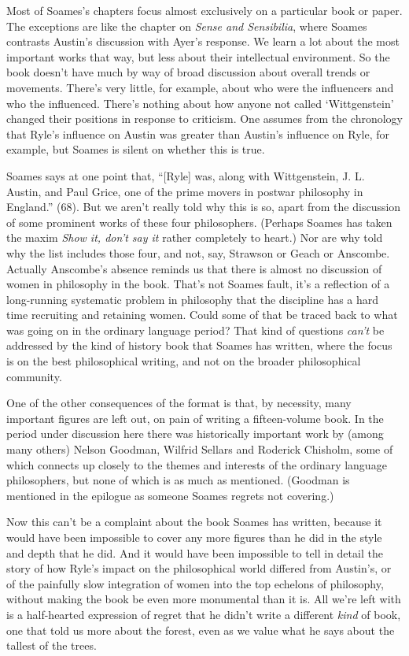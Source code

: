 Most of Soames's chapters focus almost exclusively on a particular book or paper. The exceptions are like the chapter on \textit{Sense and Sensibilia}, where Soames contrasts Austin's discussion with Ayer's response. We learn a lot about the most important works that way, but less about their intellectual environment. So the book doesn't have much by way of broad discussion about overall trends or movements. There's very little, for example, about who were the influencers and who the influenced. There's nothing about how anyone not called `Wittgenstein' changed their positions in response to criticism. One assumes from the chronology that Ryle's influence on Austin was greater than Austin's influence on Ryle, for example, but Soames is silent on whether this is true.

Soames says at one point that, ``[Ryle] was, along with Wittgenstein, J. L. Austin, and Paul Grice, one of the prime movers in postwar philosophy in England.'' (68). But we aren't really told why this is so, apart from the discussion of some prominent works of these four philosophers. (Perhaps Soames has taken the maxim \textit{Show it, don't say it} rather completely to heart.) Nor are why told why the list includes those four, and not, say, Strawson or Geach or Anscombe. Actually Anscombe's absence reminds us that there is almost no discussion of women in philosophy in the book. That's not Soames fault, it's a reflection of a long-running systematic problem in philosophy that the discipline has a hard time recruiting and retaining women. Could some of that be traced back to what was going on in the ordinary language period? That kind of questions \textit{can't} be addressed by the kind of history book that Soames has written, where the focus is on the best philosophical writing, and not on the broader philosophical community.

One of the other consequences of the format is that, by necessity, many important figures are left out, on pain of writing a fifteen-volume book. In the period under discussion here there was historically important work by (among many others) Nelson Goodman, Wilfrid Sellars and Roderick Chisholm, some of which connects up closely to the themes and interests of the ordinary language philosophers, but none of which is as much as mentioned. (Goodman is mentioned in the epilogue as someone Soames regrets not covering.) 

Now this can't be a complaint about the book Soames has written, because it would have been impossible to cover any more figures than he did in the style and depth that he did. And it would have been impossible to tell in detail the story of how Ryle's impact on the philosophical world differed from Austin's, or of the painfully slow integration of women into the top echelons of philosophy, without making the book be even more monumental than it is. All we're left with is a half-hearted expression of regret that he didn't write a different \textit{kind} of book, one that told us more about the forest, even as we value what he says about the tallest of the trees.

